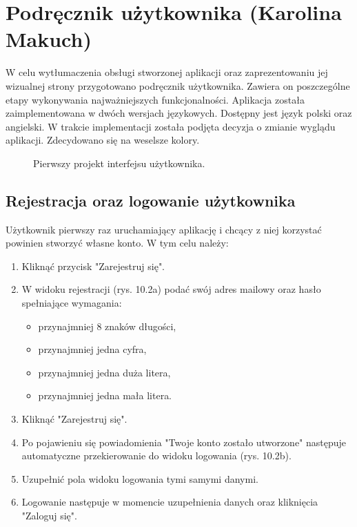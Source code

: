 \chapter{Podręcznik użytkownika (Karolina Makuch)}
\par W celu wytłumaczenia obsługi stworzonej aplikacji oraz zaprezentowaniu jej wizualnej strony przygotowano podręcznik użytkownika. Zawiera on poszczególne etapy wykonywania najważniejszych funkcjonalności.
Aplikacja została zaimplementowana w dwóch wersjach językowych. Dostępny jest język polski oraz angielski.
W trakcie implementacji została podjęta decyzja o zmianie wyglądu aplikacji. Zdecydowano się na weselsze kolory.

\begin{figure}[h]

\centering
\null\hfill
{}
\hfill
{}
\hfill
{}
\hfill\null

\caption{Pierwszy projekt interfejsu użytkownika.}
\label{fig:podrecznik10}
\end{figure}
\FloatBarrier

\section{Rejestracja oraz logowanie użytkownika}
Użytkownik pierwszy raz uruchamiający aplikację i chcący z niej korzystać powinien stworzyć własne konto. W tym celu należy:

\begin{enumerate}
\item Kliknąć przycisk "Zarejestruj się".
\item W widoku rejestracji (rys. 10.2a) podać swój adres mailowy oraz hasło spełniające wymagania:
\begin{itemize}
\item przynajmniej 8 znaków długości,
\item przynajmniej jedna cyfra,
\item przynajmniej jedna duża litera,
\item przynajmniej jedna mała litera.
\end{itemize}

\item Kliknąć "Zarejestruj się".
\item Po pojawieniu się powiadomienia "Twoje konto zostało utworzone" następuje automatyczne przekierowanie do widoku logowania (rys. 10.2b).
\item Uzupełnić pola widoku logowania tymi samymi danymi.
\item Logowanie następuje w momencie uzupełnienia danych oraz kliknięcia "Zaloguj się".
\end{enumerate}

